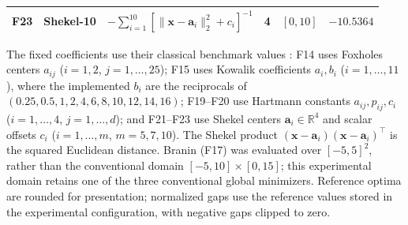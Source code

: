 \begin{table}[H]
\begin{tabularx}{\textwidth}{c>{\raggedright\arraybackslash}p{2.1cm}>{\footnotesize\raggedright\arraybackslash}X ccc}
F23 & Shekel-10 & $-\sum_{i=1}^{10}\left[\|\mathbf{x}-\mathbf{a}_i\|_2^2+c_i\right]^{-1}$ & 4 & $[0,10]$ & $-10.5364$ \\
\bottomrule
\end{tabularx}
\noindent\footnotesize
The fixed coefficients use their classical benchmark values \cite{Yao1999}: F14 uses Foxholes centers $a_{ij}$ ($i=1,2$, $j=1,\ldots,25$); F15 uses Kowalik coefficients $a_i,b_i$ ($i=1,\ldots,11$), where the implemented $b_i$ are the reciprocals of $(0.25,0.5,1,2,4,6,8,10,12,14,16)$; F19--F20 use Hartmann constants $a_{ij},p_{ij},c_i$ ($i=1,\ldots,4$, $j=1,\ldots,d$); and F21--F23 use Shekel centers $\mathbf{a}_i\in\mathbb{R}^4$ and scalar offsets $c_i$ ($i=1,\ldots,m$, $m=5,7,10$). The Shekel product $(\mathbf{x}-\mathbf{a}_i)(\mathbf{x}-\mathbf{a}_i)^\top$ is the squared Euclidean distance.
Branin (F17) was evaluated over $[-5,5]^2$, rather than the conventional domain $[-5,10]\times[0,15]$; this experimental domain retains one of the three conventional global minimizers.
Reference optima are rounded for presentation; normalized gaps use the reference values stored in the experimental configuration, with negative gaps clipped to zero.
\end{table}
